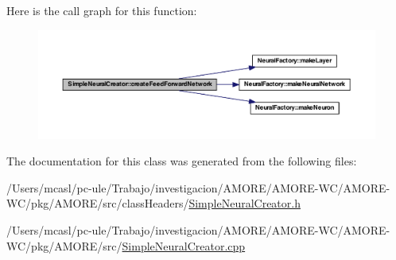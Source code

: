Here is the call graph for this function:
\nopagebreak
\begin{figure}[H]
\begin{center}
\leavevmode
\includegraphics[width=400pt]{class_simple_neural_creator_a02ea62733f819e7b4a0b9878910545c5_cgraph}
\end{center}
\end{figure}




The documentation for this class was generated from the following files:\begin{DoxyCompactItemize}
\item 
/Users/mcasl/pc-\/ule/Trabajo/investigacion/AMORE/AMORE-\/WC/AMORE-\/WC/pkg/AMORE/src/classHeaders/\hyperlink{_simple_neural_creator_8h}{SimpleNeuralCreator.h}\item 
/Users/mcasl/pc-\/ule/Trabajo/investigacion/AMORE/AMORE-\/WC/AMORE-\/WC/pkg/AMORE/src/\hyperlink{_simple_neural_creator_8cpp}{SimpleNeuralCreator.cpp}\end{DoxyCompactItemize}
